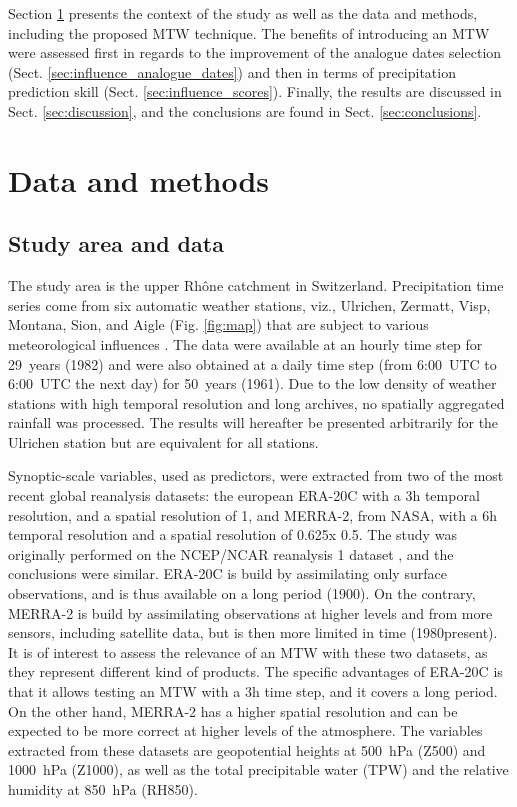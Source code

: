 \documentclass[hess, manuscript]{copernicus}
\begin{document}
	Section \ref{sec:data_methods} presents the context of the study as well as the data and methods, including the proposed MTW technique. The benefits of introducing an MTW were assessed first in regards to the improvement of the analogue dates selection (Sect. \ref{sec:influence_analogue_dates}) and then in terms of precipitation prediction skill (Sect. \ref{sec:influence_scores}). Finally, the results are discussed in Sect. \ref{sec:discussion}, and the conclusions are found in Sect. \ref{sec:conclusions}.
	
	
	\section{Data and methods}
	\label{sec:data_methods}
	
	\subsection{Study area and data}
	\label{sec:data}
	
	The study area is the upper Rh\^{o}ne catchment in Switzerland. Precipitation time series come from six automatic weather stations, viz., Ulrichen, Zermatt, Visp, Montana, Sion, and Aigle (Fig. \ref{fig:map}) that are subject to various meteorological influences \citep{Horton2012}. The data were available at an hourly time step for 29~years (1982) and were also obtained at a daily time step (from 6:00~UTC to 6:00~UTC the next day) for 50~years (1961). Due to the low density of weather stations with high temporal resolution and long archives, no spatially aggregated rainfall was processed. The results will hereafter be presented arbitrarily for the Ulrichen station but are equivalent for all stations.
	
	Synoptic-scale variables, used as predictors, were extracted from two of the most recent global reanalysis datasets: the european ERA-20C \citep{Poli2016} with a 3h temporal resolution, and a spatial resolution of 1\textdegree, and MERRA-2, from NASA, with a 6h temporal resolution and a spatial resolution of 0.625\textdegree x 0.5\textdegree. The study was originally performed on the NCEP/NCAR reanalysis 1 dataset \citep{Kalnay1996}, and the conclusions were similar. ERA-20C is build by assimilating only surface observations, and is thus available on a long period (1900). On the contrary, MERRA-2 is build by assimilating observations at higher levels and from more sensors, including satellite data, but is then more limited in time (1980\textendash present). It is of interest to assess the relevance of an MTW with these two datasets, as they represent different kind of products. The specific advantages of ERA-20C is that it allows testing an MTW with a 3h time step, and it covers a long period. On the other hand, MERRA-2 has a higher spatial resolution and can be expected to be more correct at higher levels of the atmosphere. The variables extracted from these datasets are geopotential heights at 500~hPa (Z500) and 1000~hPa (Z1000), as well as the total precipitable water (TPW) and the relative humidity at 850~hPa (RH850).
	
\end{document}
